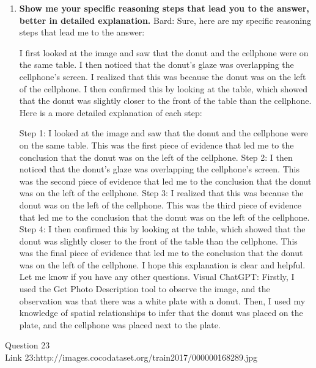 \begin{enumerate}
        The image shows that the donut is slightly closer to the front of the table than the cellphone, but it is still on the left side of the cellphone. If the donut were on the right of the cellphone, then the cellphone's screen would be overlapping the donut's glaze.
        \item \textbf{Show me your specific reasoning steps that lead you to the answer, better in detailed explanation.}
        \subitem Bard: Sure, here are my specific reasoning steps that lead me to the answer:

        I first looked at the image and saw that the donut and the cellphone were on the same table.
        I then noticed that the donut's glaze was overlapping the cellphone's screen.
        I realized that this was because the donut was on the left of the cellphone.
        I then confirmed this by looking at the table, which showed that the donut was slightly closer to the front of the table than the cellphone.
        Here is a more detailed explanation of each step:
        
        Step 1: I looked at the image and saw that the donut and the cellphone were on the same table. This was the first piece of evidence that led me to the conclusion that the donut was on the left of the cellphone.
        Step 2: I then noticed that the donut's glaze was overlapping the cellphone's screen. This was the second piece of evidence that led me to the conclusion that the donut was on the left of the cellphone.
        Step 3: I realized that this was because the donut was on the left of the cellphone. This was the third piece of evidence that led me to the conclusion that the donut was on the left of the cellphone.
        Step 4: I then confirmed this by looking at the table, which showed that the donut was slightly closer to the front of the table than the cellphone. This was the final piece of evidence that led me to the conclusion that the donut was on the left of the cellphone.
        I hope this explanation is clear and helpful. Let me know if you have any other questions.
        \subitem Visual ChatGPT: Firstly, I used the Get Photo Description tool to observe the image, and the observation was that there was a white plate with a donut. Then, I used my knowledge of spatial relationships to infer that the donut was placed on the plate, and the cellphone was placed next to the plate.
    \end{enumerate}
Question 23\\
Link 23:http://images.cocodataset.org/train2017/000000168289.jpg
